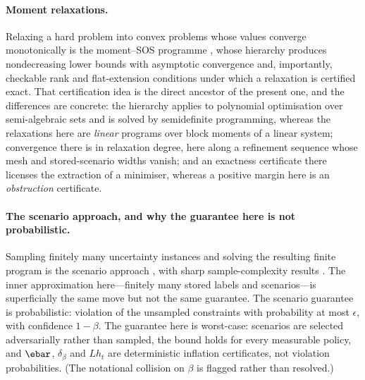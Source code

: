 \paragraph{Moment relaxations.}
Relaxing a hard problem into convex problems whose values converge monotonically is the moment--SOS programme \cite{Lasserre2001,Parrilo2003}, whose hierarchy produces nondecreasing lower bounds with asymptotic convergence and, importantly, checkable rank and flat-extension conditions under which a relaxation is certified exact. That certification idea is the direct ancestor of the present one, and the differences are concrete: the hierarchy applies to polynomial optimisation over semi-algebraic sets and is solved by semidefinite programming, whereas the relaxations here are \emph{linear} programs over block moments of a linear system; convergence there is in relaxation degree, here along a refinement sequence whose mesh and stored-scenario widths vanish; and an exactness certificate there licenses the extraction of a minimiser, whereas a positive margin here is an \emph{obstruction} certificate.

\paragraph{The scenario approach, and why the guarantee here is not probabilistic.}
Sampling finitely many uncertainty instances and solving the resulting finite program is the scenario approach \cite{CalafioreCampi2005,CalafioreCampi2006}, with sharp sample-complexity results \cite{CampiGaratti2008,CampiGaratti2011,CampiGarattiPrandini2009}. The inner approximation here---finitely many stored labels and scenarios---is superficially the same move but not the same guarantee. The scenario guarantee is probabilistic: violation of the unsampled constraints with probability at most $\epsilon$, with confidence $1-\beta$. The guarantee here is worst-case: scenarios are selected adversarially rather than sampled, the bound holds for every measurable policy, and $\ebar$, $\delta_\beta$ and $Lh_t$ are deterministic inflation certificates, not violation probabilities. (The notational collision on $\beta$ is flagged rather than resolved.)

